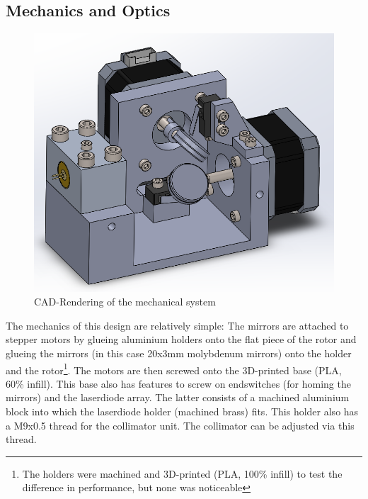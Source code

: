 \documentclass[a4paper, 11pt]{scrartcl}
\begin{document}
\subsection{Mechanics and Optics}
\begin{figure}[H]
\begin{center}
\includegraphics[width=15cm]{img/mechanics.png}
\caption{CAD-Rendering of the mechanical system}
\label{mechanics}
\end{center}
\end{figure}
The mechanics of this design are relatively simple: The mirrors are attached to stepper motors by glueing aluminium holders onto the flat piece of the rotor and glueing the mirrors (in this case 20x3mm molybdenum mirrors) onto the holder and the rotor\footnote{The holders were machined and 3D-printed (PLA, 100\% infill) to test the difference in performance, but none was noticeable}. The motors are then screwed onto the 3D-printed base (PLA, 60\% infill). This base also has features to screw on endswitches (for homing the mirrors) and the laserdiode array. The latter consists of a machined aluminium block into which the laserdiode holder (machined brass) fits. This holder also has a M9x0.5 thread for the collimator unit. The collimator can be adjusted via this thread.
\end{document}
